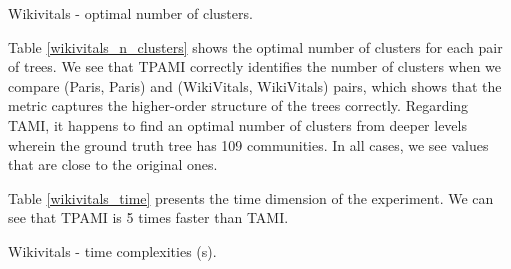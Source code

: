 \begin{table}[H]
	\centering
	\caption{Wikivitals - optimal number of clusters. \label{wikivitals_n_clusters}}
	\subfigure[TAMI.]{
		\centering
		 
	}
	\subfigure[TPAMI.]{
		
	}
\end{table}

Table \ref{wikivitals_n_clusters} shows the optimal number of clusters for each pair of trees. We see that TPAMI correctly identifies the number of clusters when we compare (Paris, Paris) and (WikiVitals, WikiVitals) pairs, which shows that the metric captures the higher-order structure of the trees correctly. Regarding TAMI, it happens to find an optimal number of clusters from deeper levels wherein the ground truth tree has 109 communities. In all cases, we see values that are close to the original ones.

Table \ref{wikivitals_time} presents the time dimension of the experiment. We can see that TPAMI is 5 times faster than TAMI.

\begin{table}[H]
	\centering
	\caption{Wikivitals - time complexities (s).}
	\label{wikivitals_time}
	\subfigure[TAMI.]{
		\centering
		 
	}
	\subfigure[TPAMI.]{
		
	}
\end{table}